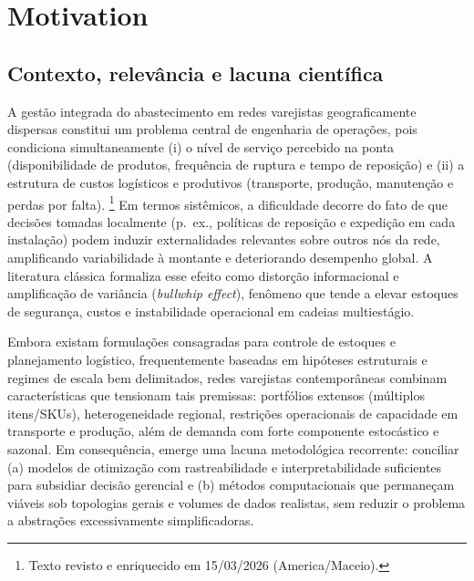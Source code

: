 

\section{Motivation}

\subsection{Contexto, relevância e lacuna científica}

A gestão integrada do abastecimento em redes varejistas geograficamente dispersas constitui um problema central de engenharia de operações, pois condiciona simultaneamente (i) o nível de serviço percebido na ponta (disponibilidade de produtos, frequência de ruptura e tempo de reposição) e (ii) a estrutura de custos logísticos e produtivos (transporte, produção, manutenção e perdas por falta). \cite{SimchiLevi2009CadeiaSuprimentos,Chopra2022SCM,Ballou2006GCSLogistica}\footnote{Texto revisto e enriquecido em 15/03/2026 (America/Maceio).} Em termos sistêmicos, a dificuldade decorre do fato de que decisões tomadas localmente (p.\ ex., políticas de reposição e expedição em cada instalação) podem induzir externalidades relevantes sobre outros nós da rede, amplificando variabilidade à montante e deteriorando desempenho global. A literatura clássica formaliza esse efeito como distorção informacional e amplificação de variância (\emph{bullwhip effect}), fenômeno que tende a elevar estoques de segurança, custos e instabilidade operacional em cadeias multiestágio. \cite{LeePadmanabhanWhang1997Bullwhip}

Embora existam formulações consagradas para controle de estoques e planejamento logístico, frequentemente baseadas em hipóteses estruturais e regimes de escala bem delimitados, redes varejistas contemporâneas combinam características que tensionam tais premissas: portfólios extensos (múltiplos itens/SKUs), heterogeneidade regional, restrições operacionais de capacidade em transporte e produção, além de demanda com forte componente estocástico e sazonal. \cite{Axsater2006InventoryControl,Zipkin2000FoundationsInventory} Em consequência, emerge uma lacuna metodológica recorrente: conciliar (a) modelos de otimização com rastreabilidade e interpretabilidade suficientes para subsidiar decisão gerencial e (b) métodos computacionais que permaneçam viáveis sob topologias gerais e volumes de dados realistas, sem reduzir o problema a abstrações excessivamente simplificadoras. \cite{Shapiro2001ModelingSupplyChain,AhujaMagnantiOrlin1993NetworkFlows,Boute2022DRLInventoryRoadmap}


